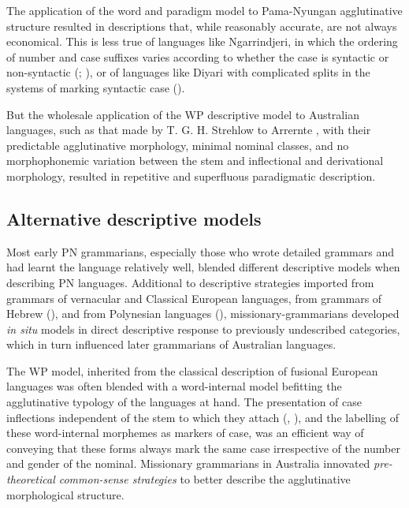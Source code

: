 The application of the word and paradigm model to Pama-Nyungan agglutinative structure resulted in descriptions that, while reasonably accurate, are not always economical. This is less true of languages like Ngarrindjeri, in which the ordering of number and case suffixes varies according to whether the case is syntactic or non-syntactic (\citealt{meyer_vocabulary_1843}; \citealt[101]{horgen_languages_2004}), or of languages like Diyari with complicated splits in the systems of marking syntactic case ().

But the wholesale application of the WP descriptive model to Australian languages, such as that made by T. G. H. Strehlow to Arrernte \citep[§2.4.1.2]{Stockigt2017}, with their predictable agglutinative morphology, minimal nominal classes, and no morphophonemic variation between the stem and inflectional and derivational morphology, resulted in repetitive and superfluous paradigmatic description.
 
\subsection{Alternative descriptive models}
\label{sec:key:2.4.2}

Most early PN grammarians, especially those who wrote detailed grammars and had learnt the language relatively well, blended different descriptive models when describing PN languages. Additional to descriptive strategies imported from grammars of vernacular and Classical European languages, from grammars of Hebrew (), and from Polynesian languages (), missionary-grammarians developed \textit{in situ} models in direct descriptive response to previously undescribed categories, which in turn influenced later grammarians of Australian languages.

The WP model, inherited from the classical description of fusional European languages was often blended with a word-internal model befitting the agglutinative typology of the languages at hand. The presentation of case inflections independent of the stem to which they attach (, ), and the labelling of these word-internal morphemes as markers of case, was an efficient way of conveying that these forms always mark the same case irrespective of the number and gender of the nominal. Missionary grammarians in Australia innovated \textit{pre-theoretical common-sense strategies} to better describe the agglutinative morphological structure.

